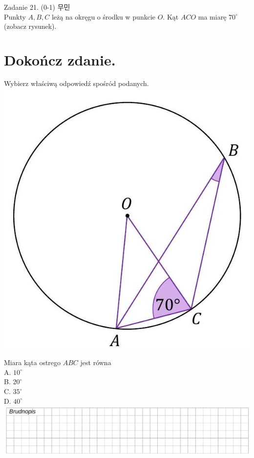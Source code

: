 \documentclass[10pt]{article}
\begin{document}
Zadanie 21. (0-1) 무민\\
Punkty \(A, B, C\) leżą na okręgu o środku w punkcie \(O\). Kąt \(A C O\) ma miarę \(70^{\circ}\) (zobacz rysunek).

\section*{Dokończ zdanie.}
Wybierz właściwą odpowiedź spośród podanych.\\
\includegraphics[max width=\textwidth, center]{2024_11_21_51cb67544fb9b029f01cg-18(2)}

Miara kąta ostrego \(A B C\) jest równa\\
A. \(10^{\circ}\)\\
B. \(20^{\circ}\)\\
C. \(35^{\circ}\)\\
D. \(40^{\circ}\)\\
\includegraphics[max width=\textwidth, center]{2024_11_21_51cb67544fb9b029f01cg-18}
\end{document}
